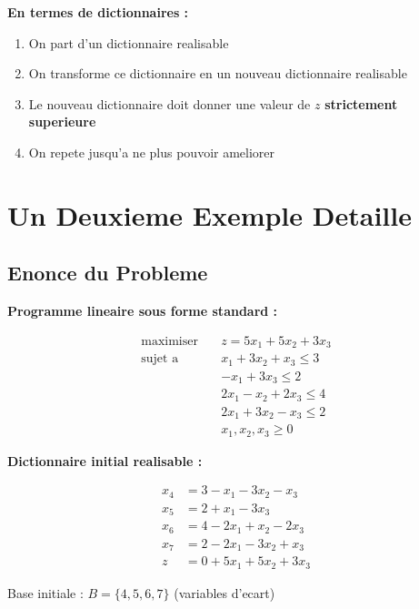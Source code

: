 \documentclass[12pt,a4paper]{article}
\begin{document}
\begin{astuce}
\textbf{En termes de dictionnaires :}

\begin{enumerate}
    \item On part d'un dictionnaire realisable
    \item On transforme ce dictionnaire en un nouveau dictionnaire realisable
    \item Le nouveau dictionnaire doit donner une valeur de $z$ \textcolor{defvert}{\textbf{strictement superieure}}
    \item On repete jusqu'a ne plus pouvoir ameliorer
\end{enumerate}
\end{astuce}

\newpage
\section{Un Deuxieme Exemple Detaille}

\subsection{Enonce du Probleme}

\begin{exemple}
\textbf{Programme lineaire sous forme standard :}

\begin{align*}
\text{maximiser} \quad & z = 5x_1 + 5x_2 + 3x_3\\
\text{sujet a} \quad & x_1 + 3x_2 + x_3 \leq 3\\
& -x_1 + 3x_3 \leq 2\\
& 2x_1 - x_2 + 2x_3 \leq 4\\
& 2x_1 + 3x_2 - x_3 \leq 2\\
& x_1, x_2, x_3 \geq 0
\end{align*}

\textbf{Dictionnaire initial realisable :}

\begin{align*}
x_4 &= 3 - x_1 - 3x_2 - x_3\\
x_5 &= 2 + x_1 - 3x_3\\
x_6 &= 4 - 2x_1 + x_2 - 2x_3\\
x_7 &= 2 - 2x_1 - 3x_2 + x_3\\
z &= 0 + 5x_1 + 5x_2 + 3x_3
\end{align*}

Base initiale : $B = \{4, 5, 6, 7\}$ (variables d'ecart)
\end{exemple}
\end{document}
